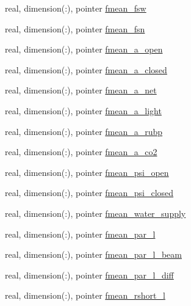 \begin{DoxyCompactItemize}
\item 
real, dimension(\+:), pointer \hyperlink{structed__state__vars_1_1edtype_a9e083a70e257deeca72243895c06d060}{fmean\+\_\+fsw}
\item 
real, dimension(\+:), pointer \hyperlink{structed__state__vars_1_1edtype_ab6ccbb6e4eb8887961c81aea2e06f03a}{fmean\+\_\+fsn}
\item 
real, dimension(\+:), pointer \hyperlink{structed__state__vars_1_1edtype_aee425dcaed18070aa0813dfe4bf02c1f}{fmean\+\_\+a\+\_\+open}
\item 
real, dimension(\+:), pointer \hyperlink{structed__state__vars_1_1edtype_ac24cb8cf158f6fa81c031c2ed3ebbe97}{fmean\+\_\+a\+\_\+closed}
\item 
real, dimension(\+:), pointer \hyperlink{structed__state__vars_1_1edtype_afc568bba1719b62b9f0792ecca9f6a37}{fmean\+\_\+a\+\_\+net}
\item 
real, dimension(\+:), pointer \hyperlink{structed__state__vars_1_1edtype_aeffd3272e4d43cd129cbd6d14fb81481}{fmean\+\_\+a\+\_\+light}
\item 
real, dimension(\+:), pointer \hyperlink{structed__state__vars_1_1edtype_a453a2de36db3549d4af7b259bc84c1a5}{fmean\+\_\+a\+\_\+rubp}
\item 
real, dimension(\+:), pointer \hyperlink{structed__state__vars_1_1edtype_a8dfeed3e608a94da2d382adfc30e458c}{fmean\+\_\+a\+\_\+co2}
\item 
real, dimension(\+:), pointer \hyperlink{structed__state__vars_1_1edtype_aab96d77d4af5cc308954699463cd6bb8}{fmean\+\_\+psi\+\_\+open}
\item 
real, dimension(\+:), pointer \hyperlink{structed__state__vars_1_1edtype_aacb7830cb513f7edfef2749def2cda49}{fmean\+\_\+psi\+\_\+closed}
\item 
real, dimension(\+:), pointer \hyperlink{structed__state__vars_1_1edtype_a4d47aa9386d179d0e36f1053c2cd52fb}{fmean\+\_\+water\+\_\+supply}
\item 
real, dimension(\+:), pointer \hyperlink{structed__state__vars_1_1edtype_a1cfc5dad256349a3e3e64da142593a8c}{fmean\+\_\+par\+\_\+l}
\item 
real, dimension(\+:), pointer \hyperlink{structed__state__vars_1_1edtype_a5d837a0b627112e65b83147857df1095}{fmean\+\_\+par\+\_\+l\+\_\+beam}
\item 
real, dimension(\+:), pointer \hyperlink{structed__state__vars_1_1edtype_a6edee1bed28ede2120ecc9512c7d66a7}{fmean\+\_\+par\+\_\+l\+\_\+diff}
\item 
real, dimension(\+:), pointer \hyperlink{structed__state__vars_1_1edtype_a45b95903df5c7396e89db16490646ede}{fmean\+\_\+rshort\+\_\+l}

\end{DoxyCompactItemize}
